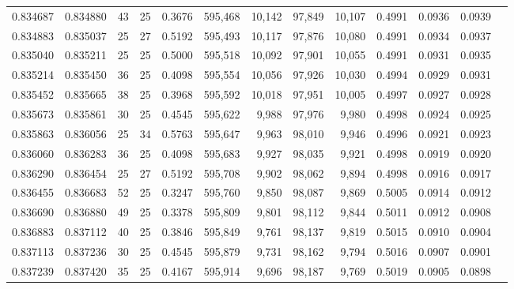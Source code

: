 \begin{tabular}{rrrrrrrrrrrrr}
0.834687 & 0.834880 &    43 &  25 &                                     0.3676 & 595,468 &  10,142 &  97,849 &  10,107 & 0.4991 & 0.0936 & 0.0939 \\
0.834883 & 0.835037 &    25 &  27 &                                     0.5192 & 595,493 &  10,117 &  97,876 &  10,080 & 0.4991 & 0.0934 & 0.0937 \\
0.835040 & 0.835211 &    25 &  25 &                                     0.5000 & 595,518 &  10,092 &  97,901 &  10,055 & 0.4991 & 0.0931 & 0.0935 \\
0.835214 & 0.835450 &    36 &  25 &                                     0.4098 & 595,554 &  10,056 &  97,926 &  10,030 & 0.4994 & 0.0929 & 0.0931 \\
0.835452 & 0.835665 &    38 &  25 &                                     0.3968 & 595,592 &  10,018 &  97,951 &  10,005 & 0.4997 & 0.0927 & 0.0928 \\
0.835673 & 0.835861 &    30 &  25 &                                     0.4545 & 595,622 &   9,988 &  97,976 &   9,980 & 0.4998 & 0.0924 & 0.0925 \\
0.835863 & 0.836056 &    25 &  34 &                                     0.5763 & 595,647 &   9,963 &  98,010 &   9,946 & 0.4996 & 0.0921 & 0.0923 \\
0.836060 & 0.836283 &    36 &  25 &                                     0.4098 & 595,683 &   9,927 &  98,035 &   9,921 & 0.4998 & 0.0919 & 0.0920 \\
0.836290 & 0.836454 &    25 &  27 &                                     0.5192 & 595,708 &   9,902 &  98,062 &   9,894 & 0.4998 & 0.0916 & 0.0917 \\
0.836455 & 0.836683 &    52 &  25 &                                     0.3247 & 595,760 &   9,850 &  98,087 &   9,869 & 0.5005 & 0.0914 & 0.0912 \\
0.836690 & 0.836880 &    49 &  25 &                                     0.3378 & 595,809 &   9,801 &  98,112 &   9,844 & 0.5011 & 0.0912 & 0.0908 \\
0.836883 & 0.837112 &    40 &  25 &                                     0.3846 & 595,849 &   9,761 &  98,137 &   9,819 & 0.5015 & 0.0910 & 0.0904 \\
0.837113 & 0.837236 &    30 &  25 &                                     0.4545 & 595,879 &   9,731 &  98,162 &   9,794 & 0.5016 & 0.0907 & 0.0901 \\
0.837239 & 0.837420 &    35 &  25 &                                     0.4167 & 595,914 &   9,696 &  98,187 &   9,769 & 0.5019 & 0.0905 & 0.0898 \\

\end{tabular}
